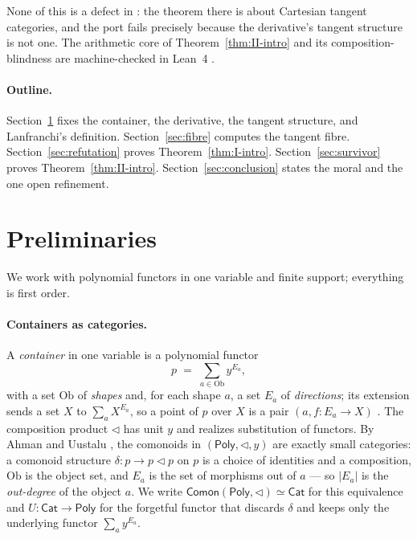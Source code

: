 \documentclass[11pt]{article}
\theoremstyle{definition}
\newcommand{\Poly}{\mathsf{Poly}}
\newcommand{\Cat}{\mathsf{Cat}}
\newcommand{\Comon}{\mathsf{Comon}}
\newcommand{\Ob}{\mathrm{Ob}}
\begin{document}
None of this is a defect in \cite{Lanfranchi2026}: the theorem there is about Cartesian tangent
categories, and the port fails precisely because the derivative's tangent structure is not one.
The arithmetic core of Theorem~\ref{thm:II-intro} and its composition-blindness are
machine-checked in Lean~4 \cite{MacBethLean}.

\paragraph{Outline.} Section~\ref{sec:prelim} fixes the container, the derivative, the tangent
structure, and Lanfranchi's definition. Section~\ref{sec:fibre} computes the tangent fibre.
Section~\ref{sec:refutation} proves Theorem~\ref{thm:I-intro}. Section~\ref{sec:survivor} proves
Theorem~\ref{thm:II-intro}. Section~\ref{sec:conclusion} states the moral and the one open
refinement.

\section{Preliminaries}\label{sec:prelim}

We work with polynomial functors in one variable and finite support; everything is first order.

\paragraph{Containers as categories.}
A \emph{container} in one variable is a polynomial functor
\[
   p \;=\; \sum_{a\in\Ob} y^{E_a},
\]
with a set $\Ob$ of \emph{shapes} and, for each shape $a$, a set $E_a$ of \emph{directions}; its
extension sends a set $X$ to $\sum_{a}X^{E_a}$, so a point of $p$ over $X$ is a pair
$(a, f\colon E_a\to X)$ \cite{AAGM2003,GambinoKock2013}. The composition product $\lhd$ has unit
$y$ and realizes substitution of functors. By Ahman and Uustalu \cite{AhmanUustalu2016}, the
comonoids in $(\Poly,\lhd,y)$ are exactly small categories: a comonoid structure
$\delta\colon p\to p\lhd p$ on $p$ is a choice of identities and a composition, $\Ob$ is the
object set, and $E_a$ is the set of morphisms out of $a$ --- so $|E_a|$ is the \emph{out-degree}
of the object $a$. We write $\Comon(\Poly,\lhd)\simeq\Cat$ for this equivalence and
$U\colon\Cat\to\Poly$ for the forgetful functor that discards $\delta$ and keeps only the
underlying functor $\sum_a y^{E_a}$.
\end{document}
